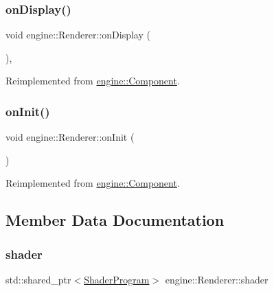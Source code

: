 \subsubsection{\texorpdfstring{on\+Display()}{onDisplay()}}
{\footnotesize\ttfamily void engine\+::\+Renderer\+::on\+Display (\begin{DoxyParamCaption}{ }\end{DoxyParamCaption})\hspace{0.3cm}{\ttfamily [private]}, {\ttfamily [virtual]}}



Reimplemented from \mbox{\hyperlink{classengine_1_1_component_a86a7778d8754130072dbea2b1901728e}{engine\+::\+Component}}.

\mbox{\label{classengine_1_1_renderer_a566c0e1bc3835f37bf18922d13901524}} 
\subsubsection{\texorpdfstring{on\+Init()}{onInit()}}
{\footnotesize\ttfamily void engine\+::\+Renderer\+::on\+Init (\begin{DoxyParamCaption}{ }\end{DoxyParamCaption})\hspace{0.3cm}{\ttfamily [virtual]}}



Reimplemented from \mbox{\hyperlink{classengine_1_1_component_aeab591561127143769e9c4f004f85652}{engine\+::\+Component}}.



\subsection{Member Data Documentation}
\mbox{\label{classengine_1_1_renderer_ab0737d025d38abcb48022d811439aec9}} 
\subsubsection{\texorpdfstring{shader}{shader}}
{\footnotesize\ttfamily std\+::shared\+\_\+ptr$<$\mbox{\hyperlink{classengine_1_1_shader_program}{Shader\+Program}}$>$ engine\+::\+Renderer\+::shader\hspace{0.3cm}{\ttfamily [private]}}

